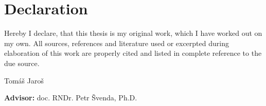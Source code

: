 \chapter*{Declaration}

\noindent
Hereby I declare, that this thesis is my original work, which I
have worked out on my own. All sources, references and literature used or
excerpted during elaboration of this work are properly cited and listed in
complete reference to the due source.

\vspace{1cm}
\begin{flushright}
    Tomáš Jaroš
\end{flushright}
\vfill
\textbf{Advisor:} doc. RNDr. Petr Švenda, Ph.D.
